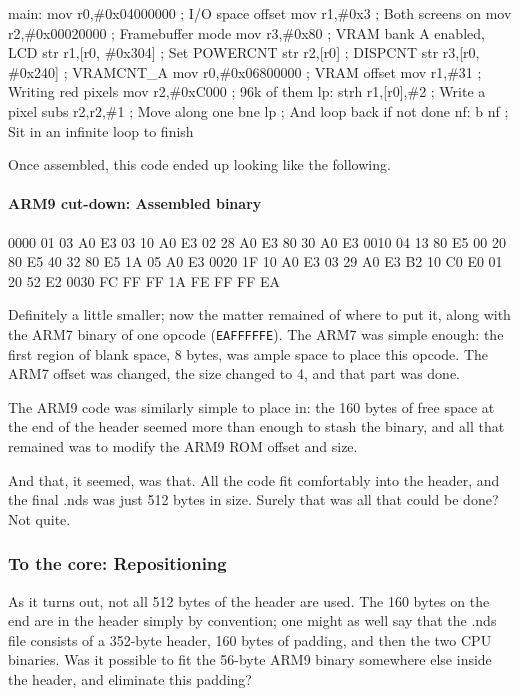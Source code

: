 \documentclass[11pt,a4paper]{article}
\let\oldparagraph\paragraph
\renewcommand{\paragraph}[1]{\oldparagraph{#1}\mbox{}}
\begin{document}
main: mov r0,\#0x04000000 ; I/O space offset mov r1,\#0x3 ; Both screens
on mov r2,\#0x00020000 ; Framebuffer mode mov r3,\#0x80 ; VRAM bank A
enabled, LCD str r1,{[}r0, \#0x304{]} ; Set POWERCNT str r2,{[}r0{]} ;
DISPCNT str r3,{[}r0, \#0x240{]} ; VRAMCNT\_A mov r0,\#0x06800000 ; VRAM
offset mov r1,\#31 ; Writing red pixels mov r2,\#0xC000 ; 96k of them
lp: strh r1,{[}r0{]},\#2 ; Write a pixel subs r2,r2,\#1 ; Move along one
bne lp ; And loop back if not done nf: b nf ; Sit in an infinite loop to
finish

Once assembled, this code ended up looking like the following.

\paragraph{ARM9 cut-down: Assembled
binary}\label{arm9-cut-down-assembled-binary}

0000 01 03 A0 E3 03 10 A0 E3 02 28 A0 E3 80 30 A0 E3 0010 04 13 80 E5 00
20 80 E5 40 32 80 E5 1A 05 A0 E3 0020 1F 10 A0 E3 03 29 A0 E3 B2 10 C0
E0 01 20 52 E2 0030 FC FF FF 1A FE FF FF EA

Definitely a little smaller; now the matter remained of where to put it,
along with the ARM7 binary of one opcode (\texttt{EAFFFFFE}). The ARM7
was simple enough: the first region of blank space, 8 bytes, was ample
space to place this opcode. The ARM7 offset was changed, the size
changed to 4, and that part was done.

The ARM9 code was similarly simple to place in: the 160 bytes of free
space at the end of the header seemed more than enough to stash the
binary, and all that remained was to modify the ARM9 ROM offset and
size.

And that, it seemed, was that. All the code fit comfortably into the
header, and the final .nds was just 512 bytes in size. Surely that was
all that could be done? Not quite.

\subsubsection{To the core:
Repositioning}\label{to-the-core-repositioning}

As it turns out, not all 512 bytes of the header are used. The 160 bytes
on the end are in the header simply by convention; one might as well say
that the .nds file consists of a 352-byte header, 160 bytes of padding,
and then the two CPU binaries. Was it possible to fit the 56-byte ARM9
binary somewhere else inside the header, and eliminate this padding?
\end{document}
